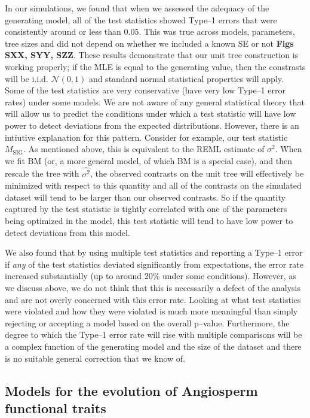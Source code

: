 \documentclass[a4paper,11pt]{article}
\begin{document}
{In our simulations, we found that when we assessed the adequacy of the generating model, all of the test statistics showed Type--1 errors that were consistently around or less than 0.05. This was true across models, parameters, tree sizes and did not depend on whether we included a known SE or not \textbf{Figs SXX, SYY, SZZ}. These results demonstrate that our unit tree construction is working properly; if the MLE is equal to the generating value, then the constrasts will be i.i.d. $\mathcal{N}(0,1)$ and standard normal statistical properties will apply. Some of the test statistics are very conservative (have very low Type--1 error rates) under some models. We are not aware of any general statistical theory that will allow us to predict the conditions under which a test statistic will have low power to detect deviations from the expected distributions. However, there is an intiutive explanation for this pattern. Consider for example, our test statistic $M_{\text{SIG}}$. As mentioned above, this is equivalent to the REML estimate of $\sigma^2$. When we fit BM (or, a more general model, of which BM is a special case), and then rescale the tree with $\hat{\sigma^2}$, the observed contrasts on the unit tree will effectively be minimized with respect to this quantity and all of the contrasts on the simulated dataset will tend to be larger than our observed contrasts. So if the quantity captured by the test statistic is tightly correlated with one of the parameters being optimized in the model, this test statistic will tend to have low power to detect deviations from this model.

We also found that by using multiple test statistics and reporting a Type--1 error if \emph{any} of the test statistics deviated significantly from expectations, the error rate increased substantially (up to around 20\% under some conditions). However, as we discuss above, we do not think that this is necessarily a defect of the analysis and are not overly concerned with this error rate. Looking at what test statistics were violated and how they were violated is much more meaningful than simply rejecting or accepting a model based on the overall p--value. Furthermore, the degree to which the Type--1 error rate will rise with multiple comparisons will be a complex function of the generating model and the size of the dataset and there is no suitable general correction that we know of.

\subsection{Models for the evolution of Angiosperm functional traits}

}
\end{document}
